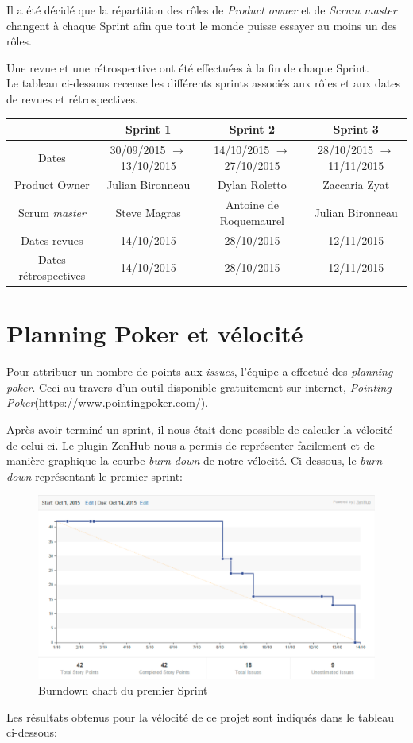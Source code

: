 \documentclass[12pt,a4paper,oneside]{book}
\begin{document}
	Il a été décidé que la répartition des rôles de \textit{Product owner }et de \textit{Scrum\textit{ master }}changent à chaque Sprint afin que tout le monde puisse essayer au moins un des rôles.
	
	Une revue et une rétrospective ont été effectuées à la fin de chaque Sprint.\\
	Le tableau ci-dessous recense les différents sprints associés aux rôles et aux dates de revues et rétrospectives.

	\hspace{-40px}
	\begin{tabular}{|c|c|c|c|}
		\hline
		& \textbf{Sprint 1 }& \textbf{Sprint 2 }& \textbf{Sprint 3}\\
		\hline
		Dates & 30/09/2015 $\rightarrow$ 13/10/2015 & 14/10/2015 $\rightarrow$ 27/10/2015 & 28/10/2015 $\rightarrow$ 11/11/2015\\
		\hline
		Product Owner & Julian Bironneau &Dylan Roletto& Zaccaria Zyat\\
		\hline
		Scrum\textit{ master }& Steve Magras & Antoine de Roquemaurel &Julian Bironneau\\
		\hline
		Dates revues & 14/10/2015& 28/10/2015& 12/11/2015\\
		\hline
		Dates rétrospectives & 14/10/2015& 28/10/2015 &12/11/2015 \\
		\hline
	\end{tabular}
	
	\section{Planning Poker et vélocité}
	Pour attribuer un nombre de points aux \textit{issues}, l'équipe a effectué des \textit{planning poker}. Ceci au travers d'un outil disponible
	gratuitement sur internet, \textit{Pointing Poker}\newline (\url{https://www.pointingpoker.com/}).
	
	Après avoir terminé un sprint, il nous était donc possible de calculer la vélocité de celui-ci. Le plugin ZenHub nous a permis de représenter facilement et de manière graphique la courbe
	\textit{burn-down} de notre vélocité. 
\newpage	
	Ci-dessous, le \textit{burn-down} représentant le premier sprint:
	\begin{figure}[H]
		\includegraphics[width=18cm]{../beamer/images/Results/methodo/burndown.png}
		\caption{Burndown chart du premier Sprint}
	\end{figure}
	Les résultats obtenus pour la vélocité de ce projet sont indiqués dans le tableau ci-dessous:
\end{document}
